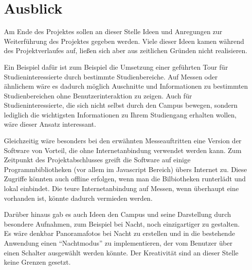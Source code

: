 \section{Ausblick}
\label{sec:Ausblick}

Am Ende des Projektes sollen an dieser Stelle Ideen und Anregungen zur Weiterführung des Projektes gegeben werden. Viele dieser Ideen kamen während des Projektverlaufes auf, ließen sich aber aus zeitlichen Gründen nicht realisieren.

Ein Beispiel dafür ist zum Beispiel die Umsetzung einer geführten Tour für Studieninteressierte durch bestimmte Studienbereiche. Auf Messen oder ähnlichem wäre es dadurch möglich Auschnitte und Informationen zu bestimmten Studienbereichen ohne Benutzerinteraktion zu zeigen. Auch für Studieninteressierte, die sich nicht selbst durch den Campus bewegen, sondern lediglich die wichtigsten Informationen zu Ihrem Studiengang erhalten wollen, wäre dieser Ansatz interessant.

Gleichzeitig wäre besonders bei den erwähnten Messeauftritten eine Version der Software von Vorteil, die ohne Internetanbindung verwendet werden kann. Zum Zeitpunkt des Projektabschlusses greift die Software auf einige Programmbibliotheken (vor allem im Javascript Bereich) übers Internet zu. Diese Zugriffe könnten auch offline erfolgen, wenn man die Bilbiotheken runterlädt und lokal einbindet. Die teure Internetanbindung auf Messen, wenn überhaupt eine vorhanden ist, könnte dadurch vermieden werden.

Darüber hinaus gab es auch Ideen den Campus und seine Darstellung durch besondere Aufnahmen, zum Beispiel bei Nacht, noch einzigartiger zu gestalten. Es wäre denkbar Panoramafotos bei Nacht zu erstellen und in die bestehende Anwendung einen "`Nachtmodus"' zu implementieren, der vom Benutzer über einen Schalter ausgewählt werden könnte. Der Kreativität sind an dieser Stelle keine Grenzen gesetzt.